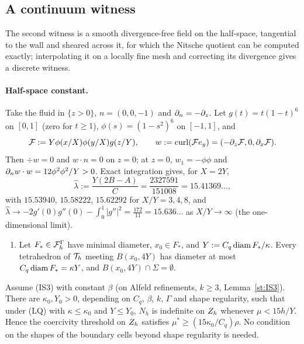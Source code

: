 \subsection{A continuum witness}
The second witness is a smooth divergence-free field on the half-space, tangential to the wall and sheared across it, for which the Nitsche quotient can be computed exactly; interpolating it on a locally fine mesh and correcting its divergence gives a discrete witness.

\paragraph{Half-space constant.} Take the fluid in $\{z>0\}$, $n=(0,0,-1)$ and $\partial_n=-\partial_z$. Let $g(t)=t(1-t)^6$ on $[0,1]$ (zero for $t\ge1$), $\phi(s)=(1-s^2)^6$ on $[-1,1]$, and
\[
\mathcal F:=Y\phi(x/X)\phi(y/X)g(z/Y),\qquad w:=\operatorname{curl}(\mathcal Fe_y)=(-\partial_z\mathcal F,0,\partial_x\mathcal F).
\]
Then $\div w=0$ and $w\cdot n=0$ on $z=0$; at $z=0$, $w_1=-\phi\phi$ and $\partial_n w\cdot w=12\phi^2\phi^2/Y>0$. Exact integration gives, for $X=2Y$,
\[
\hat\lambda:=\frac{Y(2B-A)}C=\frac{2327591}{151008}=15.41369\ldots,
\]
with $15.53940$, $15.58222$, $15.62292$ for $X/Y=3,4,8$, and $\hat\lambda\to-2g'(0)g''(0)-\int_0^1|g''|^2=\frac{172}{11}=15.636\ldots$ as $X/Y\to\infty$ (the one-dimensional limit). 

\begin{enumerate}[label=(LQ)]
\item Let $F_\ast\in\mathcal F_h^\Gamma$ have minimal diameter, $x_0\in F_\ast$, and $Y:=C_q\operatorname{diam} F_\ast/\kappa$. Every tetrahedron of $\mathcal T_h$ meeting $B(x_0,4Y)$ has diameter at most $C_q\operatorname{diam} F_\ast=\kappa Y$, and $B(x_0,4Y)\cap\Sigma=\emptyset$.
\end{enumerate}

\begin{theorem}\label{pen:cont}
Assume (IS3) with constant $\beta$ (on Alfeld refinements, $k\ge3$, Lemma~\ref{st:IS3}). There are $\kappa_0,Y_0>0$, depending on $C_q$, $\beta$, $k$, $\Gamma$ and shape regularity, such that under (LQ) with $\kappa\le\kappa_0$ and $Y\le Y_0$, $N_h$ is indefinite on $Z_h$ whenever $\mu<15h/Y$. Hence the coercivity threshold on $Z_h$ satisfies $\mu^\ast\ge(15\kappa_0/C_q)\rho$. No condition on the shapes of the boundary cells beyond shape regularity is needed.
\end{theorem}

